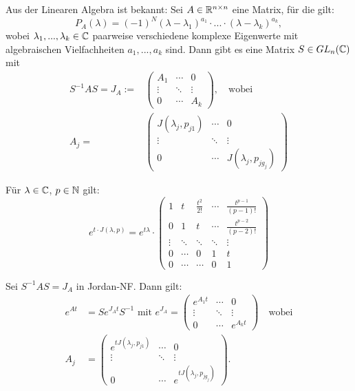 \documentclass{cheat-sheet}
\begin{document}
\begin{bem}
  Aus der Linearen Algebra ist bekannt: Sei $A \in \mathbb{R}^{n \times n}$ eine Matrix, für die gilt:
  \[ P_A(\lambda) = (-1)^N (\lambda - \lambda_1)^{a_1} \cdot ... \cdot (\lambda - \lambda_k)^{a_k}, \]
  wobei $\lambda_1, ..., \lambda_k \in \mathbb{C}$ paarweise verschiedene komplexe Eigenwerte mit algebraischen Vielfachheiten $a_1, ..., a_k$ sind. Dann gibt es eine Matrix $S \in GL_n(\mathbb{C})$ mit
  \begin{align*}
    S^{-1} A S = J_A :=& \begin{pmatrix}
      A_1 & \cdots & 0\\
      \vdots & \ddots & \vdots\\
      0 & \cdots & A_k
    \end{pmatrix},
    \quad \text{wobei}\\
    A_j =& \begin{pmatrix}
      J(\lambda_j, p_{j1}) & \cdots & 0\\
      \vdots & \ddots & \vdots\\
      0 & \cdots & J(\lambda_j, p_{j g_j})
    \end{pmatrix}
  \end{align*}
\end{bem}

\begin{prop}
  Für $\lambda \in \mathbb{C}$, $p \in \mathbb{N}$ gilt:
  \[
    e^{t \cdot J(\lambda, p)} = e^{t \lambda} \cdot \begin{pmatrix}
      1 & t & \tfrac{t^2}{2!} & \cdots & \tfrac{t^{p-1}}{(p-1)!} \\
      0 & 1 & t & \cdots & \tfrac{t^{p-2}}{(p-2)!} \\
      \vdots & \ddots & \ddots & \ddots & \vdots \\
      0 & \cdots & 0 & 1 & t \\
      0 & \cdots & \cdots & 0 & 1
    \end{pmatrix}
  \]
\end{prop}

\begin{satz}
  Sei $S^{-1} A S = J_A$ in Jordan-NF. Dann gilt:
  \begin{align*}
    e^{At} &= S e^{J_A t} S^{-1} \text{ mit } e^{J_A} = \begin{pmatrix}
      e^{A_1 t} & \cdots & 0\\
      \vdots & \ddots & \vdots\\
      0 & \cdots & e^{A_k t}
    \end{pmatrix}
    \quad \text{wobei}\\
    A_j &= \begin{pmatrix}
      e^{t J(\lambda_j, p_{j1})} & \cdots & 0\\
      \vdots & \ddots & \vdots\\
      0 & \cdots & e^{t J(\lambda_j, p_{j g_j})}
    \end{pmatrix}.
  \end{align*}
\end{satz}
\end{document}

